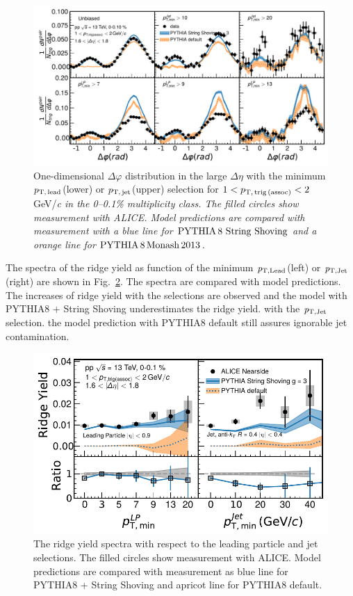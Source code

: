 \begin{figure}[h!]
	\centering
	\includegraphics[width=0.99\linewidth]{./figures/Fig5_PlotDeltaPhiESE.pdf}
	\caption{ One-dimensional $\Delta\varphi$ distribution in the large $\Delta\eta$ with the minimum $p_\mathrm{T,\,lead}$(lower) or $p_\mathrm{T,\,jet}$(upper) selection for $1<p_\mathrm{T,\,trig\,(assoc)}<2$ GeV/\it{c}\rm{} in the 0--0.1\% multiplicity class. The filled circles show measurement with ALICE. Model predictions are compared with measurement with a blue line for $\mathrm{PYTHIA}\,8~\mathrm{String}~\mathrm{Shoving}$  and a orange line for $\mathrm{PYTHIA}\,8\,\mathrm{Monash}\,2013$.}
	\label{fig:PlotDeltaPhiESE}
\end{figure}

The spectra of the ridge yield as function of the minimum $\it{p}_{\rm{T, Lead}}$(left) or $\it{p}_{\rm{T, Jet}}$(right) are shown in Fig.~\ref{fig:RidgeYield_ESE}. The spectra are compared with model predictions. 
The increases of ridge yield with the selections are observed and the model with PYTHIA8 + String Shoving underestimates the ridge yield. with the $\it{p}_{\rm{T, Jet}}$ selection. the model prediction with PYTHIA8 default still assures ignorable jet contamination.

\begin{figure}[h!]
	\centering
	\includegraphics[width=0.99\linewidth]{./figures/Fig6_RidgeYieldESE.pdf}
	\caption{The ridge yield spectra with respect to the leading particle and jet selections. The filled circles show measurement with ALICE. Model predictions are compared with measurement as blue line for PYTHIA8 + String Shoving  and apricot line for PYTHIA8 default.}
	\label{fig:RidgeYield_ESE}
\end{figure}



